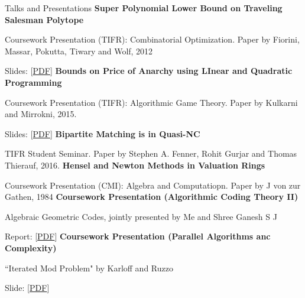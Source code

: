 \begin{rubric}{Talks and Presentations}
\entry*[2025]%
    \textbf{Super Polynomial Lower Bound on Traveling Salesman Polytope}

    Coursework Presentation (TIFR): Combinatorial Optimization. Paper by Fiorini, Massar, Pokutta, Tiwary and Wolf, 2012

    Slides: [\href{https://sohamch08.github.io/assets/copt-presentation.pdf}{PDF}]
 \entry*[2025]%
    \textbf{Bounds on Price of Anarchy using LInear and Quadratic Programming}

    Coursework Presentation (TIFR): Algorithmic Game Theory. Paper by Kulkarni and Mirrokni, 2015.

    Slides: [\href{https://sohamch08.github.io/assets/agt-presentation.pdf}{PDF}]
\entry*[2025]%
	\textbf{Bipartite Matching is in \textsf{Quasi-NC}}

    TIFR Student Seminar. Paper by Stephen A. Fenner, Rohit Gurjar and Thomas Thierauf, 2016.
\entry*[2024]%
	\textbf{Hensel and Newton Methods in Valuation Rings}

    Coursework Presentation (CMI): Algebra and Computatiopn. Paper by J von zur Gathen, 1984
\entry*[2023]%
	\textbf{Coursework Presentation (Algorithmic Coding Theory II)}

    Algebraic Geometric Codes, jointly presented by Me and Shree Ganesh S J

    Report: [\href{https://sohamch08.github.io/assets/act-report.pdf}{PDF}]
\entry*[2023]%
	\textbf{Coursework Presentation (Parallel Algorithms anc Complexity)}

    ``Iterated Mod Problem" by Karloff and Ruzzo

    Slide: [\href{https://sohamch08.github.io/assets/parallel-presentation-iterated-mod.pdf}{PDF}]
\end{rubric}
